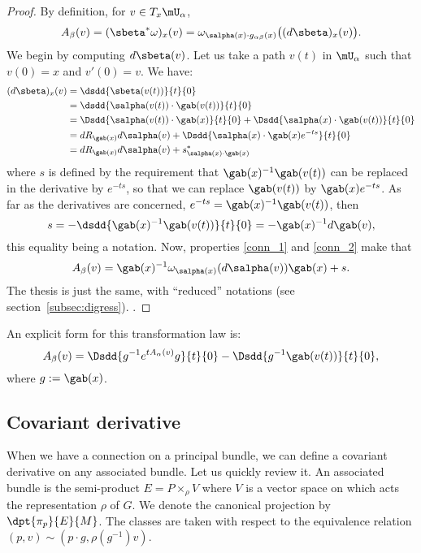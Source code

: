\begin{proof}
By definition, for $v\in T_x\mU_{\alpha}$,
\[
   A_{\beta}(v)=(\sbeta^*\omega)_x(v)=
         \omega_{\salpha(x)\cdot g_{\alpha\beta}(x)}\big((d\sbeta)_x(v)\big).
\]
We begin by computing $d\sbeta(v)$. Let us take a path $v(t)$ in $\mU_{\alpha}$ such that $v(0)=x$ and $v'(0)=v$. We have:
\begin{equation}\label{eq:1407r1}
\begin{split}
   (d\sbeta)_x(v)&=\dsdd{\sbeta(v(t))}{t}{0}\\
                 &=\dsdd{\salpha(v(t))\cdot\gab(v(t))}{t}{0}\\
		 &=\Dsdd{\salpha(v(t))\cdot\gab(x)}{t}{0}
		    +\Dsdd{\salpha(x)\cdot\gab(v(t))}{t}{0}\\
		 &=dR_{\gab(x)}d\salpha(v)+\Dsdd{\salpha(x)\cdot\gab(x)e^{-ts}}{t}{0}\\
		 &=dR_{\gab(x)}d\salpha(v)+s^*_{\salpha(x)\cdot\gab(x)}
\end{split}
\end{equation}
where $s$ is defined by the requirement\label{pg:justif_s} that $\gab(x)^{-1}\gab(v(t))$ can be replaced in the derivative by $e^{-ts}$, so that we can replace $\gab(v(t))$ by $\gab(x)e^{-ts}$. As far as the derivatives are concerned, $e^{-ts}=\gab(x)^{-1}\gab(v(t))$, then
\[
     s=-\dsdd{\gab(x)^{-1}\gab(v(t))}{t}{0}=-\gab(x)^{-1} d\gab(v),
\]
this equality being a notation. Now, properties \eqref{conn_1} and \eqref{conn_2} make that
\[
   A_{\beta}(v)=\gab(x)^{-1}\omega_{\salpha(x)}(d\salpha(v))\gab(x)+s.
\]
The thesis is just the same, with ``reduced'' notations (see section~\ref{subsec:digress}).
.
\end{proof}
An explicit form for this transformation law is:
\begin{equation}
    A_{\beta}(v)=\Dsdd{g^{-1} e^{tA_{\alpha}(v)}g}{t}{0}-\Dsdd{g^{-1}\gab(v(t))}{t}{0},
\end{equation}
where $g:=\gab(x)$.

\subsection{Covariant derivative}

When we have a connection on a principal bundle, we can define a covariant derivative on any associated bundle. Let us quickly review it. An associated bundle is the semi-product $E=P\times_{\rho} V$ where $V$ is a vector space on which acts the representation $\rho$ of $G$. We denote the canonical projection by $\dpt{\pi_p}{E}{M}$. The classes are taken with respect to the equivalence relation $(p,v)\sim(p\cdot g,\rho(g^{-1})v)$.

